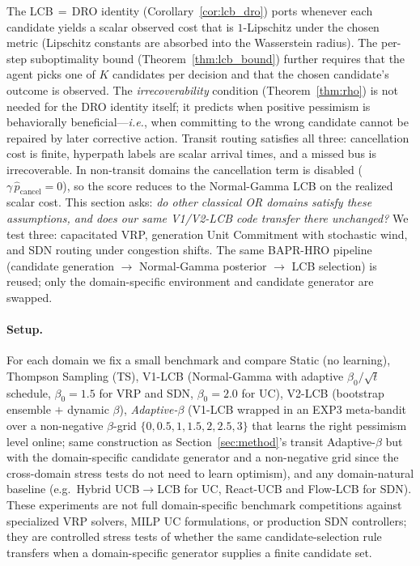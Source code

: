 \documentclass[opre,dblanonrev]{informs4}
\begin{document}
\begin{APPENDICES}
The LCB$\,=\,$DRO identity (Corollary~\ref{cor:lcb_dro}) ports
whenever each candidate yields a scalar observed cost that is
$1$-Lipschitz under the chosen metric (Lipschitz constants are
absorbed into the Wasserstein radius). The per-step suboptimality
bound (Theorem~\ref{thm:lcb_bound}) further requires that the agent
picks one of $K$ candidates per decision and that the chosen
candidate's outcome is observed. The \emph{irrecoverability}
condition (Theorem~\ref{thm:rho}) is not needed for the DRO identity
itself; it predicts when positive pessimism is behaviorally
beneficial---\emph{i.e.}, when committing to the wrong candidate
cannot be repaired by later corrective action. Transit routing
satisfies all three: cancellation cost is finite, hyperpath labels
are scalar arrival times, and a missed bus is irrecoverable. In
non-transit domains the cancellation term is disabled
($\gamma\,\hat p_{\mathrm{cancel}}=0$), so the score reduces to the
Normal-Gamma LCB on the realized scalar cost.
This section asks: \emph{do other classical OR domains satisfy these
assumptions, and does our same V1/V2-LCB code transfer there
unchanged?} We test three: capacitated VRP, generation Unit
Commitment with stochastic wind, and SDN routing under congestion
shifts. The same BAPR-HRO pipeline (candidate generation $\to$
Normal-Gamma posterior $\to$ LCB selection) is reused; only the
domain-specific environment and candidate generator are swapped.

\paragraph{Setup.}
For each domain we fix a small benchmark and compare Static
(no learning), Thompson Sampling (TS), V1-LCB (Normal-Gamma with
adaptive $\beta_0/\sqrt{t}$ schedule, $\beta_0=1.5$ for VRP and
SDN, $\beta_0=2.0$ for UC), V2-LCB (bootstrap ensemble $+$ dynamic
$\beta$), \emph{Adaptive-$\beta$} (V1-LCB wrapped in an EXP3
meta-bandit over a non-negative $\beta$-grid
$\{0,0.5,1,1.5,2,2.5,3\}$ that learns the right pessimism level
online; same construction as Section~\ref{sec:method}'s transit
Adaptive-$\beta$ but with the domain-specific candidate generator
and a non-negative grid since the cross-domain stress tests do not
need to learn optimism), and any domain-natural baseline (e.g.\
Hybrid UCB$\to$LCB for UC, React-UCB and Flow-LCB for SDN). These experiments are not full
domain-specific benchmark competitions against specialized VRP
solvers, MILP UC formulations, or production SDN controllers; they
are controlled stress tests of whether the same candidate-selection
rule transfers when a domain-specific generator supplies a finite
candidate set.


\end{APPENDICES}
\end{document}
